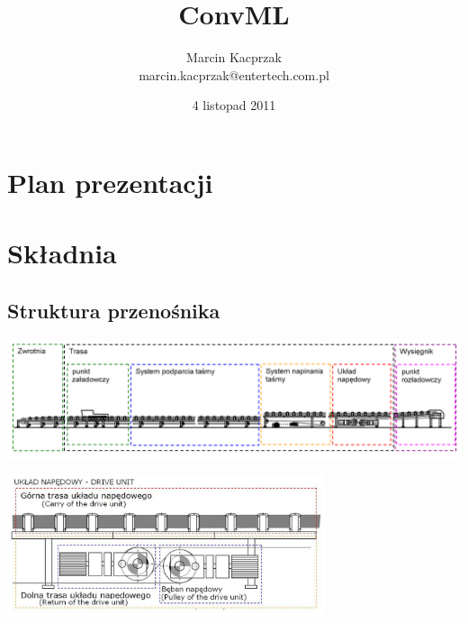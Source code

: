 \documentclass{beamer}
\title{ConvML}
\author{Marcin Kacprzak\\
marcin.kacprzak@entertech.com.pl}
\institute{EnterTECH}
\date{4 listopad 2011}
\begin{document}
\begin{frame}
\titlepage
\end{frame}

\section*{Plan prezentacji}
\begin{frame}
\tableofcontents
\end{frame}

\section{Składnia}

\subsection{Struktura przenośnika}
\begin{frame}
\includegraphics[width=\textwidth]{beamer/struktura}

\pause

\begin{center}
\includegraphics[width=0.7\textwidth]{beamer/drive_unit}
\end{center}
\end{frame}
\end{document}
